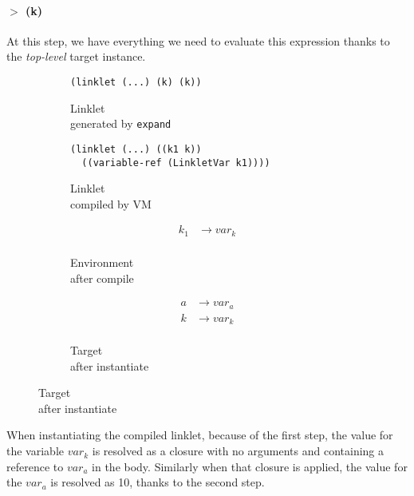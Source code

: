 \paragraph{$>$ (k)}

At this step, we have everything we need to evaluate this expression
thanks to the \emph{top-level} target instance.

\begin{figure}[h!]
  \small
  \begin{subfigure}[b]{0.25\textwidth}
    \begin{mdframed}
\begin{verbatim}
(linklet (...) (k) (k))
\end{verbatim}
    \end{mdframed}
    \caption{Linklet \\ generated by \texttt{expand}}
    \label{fig:1}
  \end{subfigure}
  \begin{subfigure}[b]{0.38\textwidth}
    \begin{mdframed}
\begin{verbatim}
(linklet (...) ((k1 k))
  ((variable-ref (LinkletVar k1))))
\end{verbatim}
    \end{mdframed}
    \caption{Linklet \\ compiled by VM}
    \label{fig:2}
  \end{subfigure} \hfill
  \begin{subfigure}[b]{0.15\textwidth}
    \begin{mdframed}
      \begin{align*}
        k_1 &\rightarrow var_k \\
      \end{align*}
    \end{mdframed}
    \caption{Environment \\ after compile}
    \label{fig:2}
  \end{subfigure}
  \begin{subfigure}[b]{0.15\textwidth}
    \begin{mdframed}
      \begin{align*}
        a &\rightarrow var_a \\
        k &\rightarrow var_k \\
      \end{align*}
    \end{mdframed}
    \caption{Target \\ after instantiate}
    \label{fig:2}
  \end{subfigure}
\end{figure}

When instantiating the compiled linklet, because of the first step,
the value for the variable $var_k$ is resolved as a closure with no
arguments and containing a reference to $var_a$ in the body. Similarly
when that closure is applied, the value for the $var_a$ is resolved as
10, thanks to the second step.
